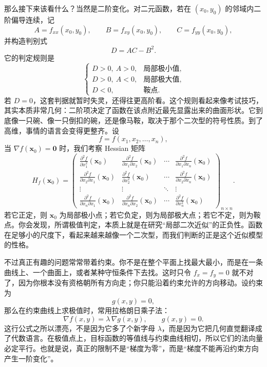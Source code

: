 \documentclass[UTF8]{ctexbook}
\begin{document}
那么接下来该看什么？当然是二阶变化。对二元函数，若在 $(x_0,y_0)$ 的邻域内二阶偏导连续，记
\[
A=f_{xx}(x_0,y_0),\qquad B=f_{xy}(x_0,y_0),\qquad C=f_{yy}(x_0,y_0),
\]
并构造判别式
\[
D=AC-B^2.
\]
它的判定规则是
\[
\begin{cases}
D>0,\ A>0,&\text{局部极小值},\\
D>0,\ A<0,&\text{局部极大值},\\
D<0,&\text{鞍点}.
\end{cases}
\]
若 $D=0$，这套判据就暂时失灵，还得往更高阶看。这个规则看起来像考试技巧，其实本质非常几何：二阶项决定了函数在该点附近最先显露出来的曲面形状。它到底像一只碗、像一只倒扣的碗，还是像马鞍，取决于那个二次型的符号性质。到了高维，事情的语言会变得更整齐。设
\[
f=f(x_1,x_2,\dots,x_n),
\]
当 $\nabla f(\mathbf{x}_0)=\mathbf{0}$ 时，我们考察 Hessian 矩阵
\[
H_f(\mathbf{x}_0) = \begin{pmatrix}
\frac{\partial^2 f}{\partial x_1^2}(\mathbf{x}_0) & \frac{\partial^2 f}{\partial x_1 \partial x_2}(\mathbf{x}_0) & \cdots & \frac{\partial^2 f}{\partial x_1 \partial x_n}(\mathbf{x}_0) \\[6pt]
\frac{\partial^2 f}{\partial x_2 \partial x_1}(\mathbf{x}_0) & \frac{\partial^2 f}{\partial x_2^2}(\mathbf{x}_0) & \cdots & \frac{\partial^2 f}{\partial x_2 \partial x_n}(\mathbf{x}_0) \\[6pt]
\vdots & \vdots & \ddots & \vdots \\[6pt]
\frac{\partial^2 f}{\partial x_n \partial x_1}(\mathbf{x}_0) & \frac{\partial^2 f}{\partial x_n \partial x_2}(\mathbf{x}_0) & \cdots & \frac{\partial^2 f}{\partial x_n^2}(\mathbf{x}_0)
\end{pmatrix}_{n \times n}.
\]
若它正定，则 $\mathbf{x}_0$ 为局部极小点；若它负定，则为局部极大点；若它不定，则为鞍点。你会发现，所谓极值判定，本质上就是在研究“局部二次近似”的正负性。函数在足够小的尺度下，看起来越来越像一个二次型，而我们判断的正是这个近似模型的性格。

不过真正有趣的问题常常带着约束。你不是在整个平面上找最大最小，而是在一条曲线上、一个曲面上，或者某种守恒条件下去找。这时只令 $f_x=f_y=0$ 就不对了，因为你根本没有资格朝所有方向走；你只能沿着约束允许的方向移动。设约束为
\[
g(x,y)=0,
\]
那么在约束曲线上求极值时，常用拉格朗日乘子法：
\[
\nabla f(x,y)=\lambda\,\nabla g(x,y),\qquad g(x,y)=0.
\]
这行公式之所以漂亮，不是因为它多了个新字母 $\lambda$，而是因为它把几何直觉翻译成了代数语言。在极值点上，目标函数的等值线与约束曲线相切，所以它们的法向量必定平行。也就是说，真正的限制不是“梯度为零”，而是“梯度不能再沿约束方向产生一阶变化”。
\end{document}
